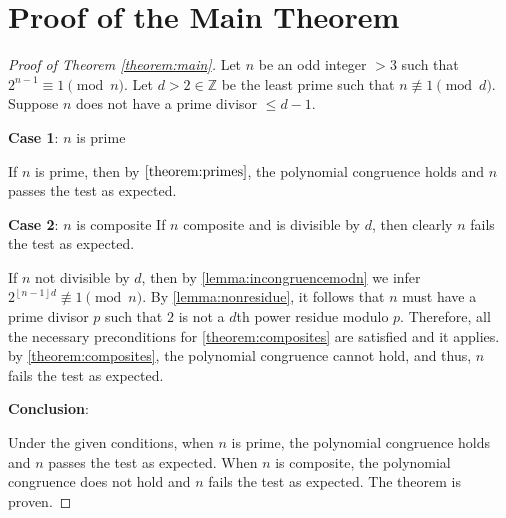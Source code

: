\documentclass{article}
\theoremstyle{plain}
\theoremstyle{definition}
\newcommand{\floor}[1]{\left\lfloor #1 \right\rfloor}
\begin{document}
\section{Proof of the Main Theorem}
\begin{proof}[Proof of Theorem \ref{theorem:main}]
Let $n$ be an odd integer $>3$ such that $2^{n-1} \equiv 1 \pmod{n}$. Let $d > 2 \in \mathbb{Z}$ be the least prime such that $n \not\equiv 1 \pmod{d}$. Suppose $n$ does not have a prime divisor $\leq d-1$.

\textbf{Case 1}: $n$ is prime

If $n$ is prime, then by $\cref{theorem:primes}$, the polynomial congruence holds and $n$ passes the test as expected.

\textbf{Case 2}: $n$ is composite
If $n$ composite and is divisible by $d$, then clearly $n$ fails the test as expected.

If $n$ not divisible by $d$, then by \cref{lemma:incongruencemodn} we infer $2^{\floor{n-1}{d}} \not\equiv 1 \pmod{n}$. By \cref{lemma:nonresidue}, it follows that $n$ must have a prime divisor $p$ such that $2$ is not a $d$th power residue modulo $p$.  Therefore, all the necessary preconditions for \cref{theorem:composites} are satisfied and it applies. by \cref{theorem:composites}, the polynomial congruence cannot hold, and thus, $n$ fails the test as expected.

\textbf{Conclusion}:

Under the given conditions, when $n$ is prime, the polynomial congruence holds and $n$ passes the test as expected. When $n$ is composite, the polynomial congruence does not hold and $n$ fails the test as expected. The theorem is proven.
\end{proof}
\end{document}
